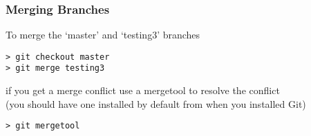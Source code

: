 \documentclass[xcolor=dvipsnames]{beamer}
\begin{document}
\begin{frame}[fragile]
  \frametitle{Merging Branches}
To merge the `master' and `testing3' branches
\begin{block}{}
\begin{lstlisting}
> git checkout master
> git merge testing3
\end{lstlisting}
\end{block}

if you get a merge conflict use a mergetool to resolve the conflict\\
(you should have one installed by default from when you installed Git)

\begin{block}{}
\begin{lstlisting}
> git mergetool
\end{lstlisting}
\end{block}
\end{frame}

%


%

\end{document}
